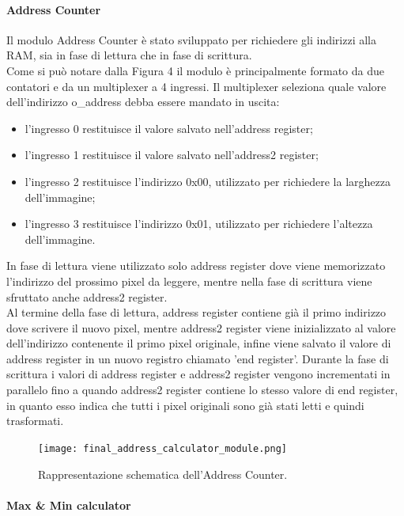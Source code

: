 \paragraph{Address Counter\\}

Il modulo Address Counter è stato sviluppato per richiedere gli indirizzi alla RAM, sia in fase di lettura che in fase di scrittura.\\
Come si può notare dalla Figura 4 il modulo è principalmente formato da due contatori e da un multiplexer a 4 ingressi. Il multiplexer seleziona quale valore dell'indirizzo o\_address debba essere mandato in uscita:
\begin{itemize}
    \item l'ingresso 0 restituisce il valore salvato nell'address register;
    \item l'ingresso 1 restituisce il valore salvato nell'address2 register;
    \item l'ingresso 2 restituisce l'indirizzo 0x00, utilizzato per richiedere la larghezza dell'immagine;
    \item l'ingresso 3 restituisce l'indirizzo 0x01, utilizzato per richiedere l'altezza dell'immagine.
\end{itemize}
In fase di lettura viene utilizzato solo address register dove viene memorizzato l'indirizzo del prossimo pixel da leggere, mentre nella fase di scrittura viene sfruttato anche address2 register.\\
Al termine della fase di lettura, address register contiene già il primo indirizzo dove scrivere il nuovo pixel, mentre address2 register viene inizializzato al valore dell'indirizzo contenente il primo pixel originale, infine viene salvato il valore di address register in un nuovo registro chiamato 'end register'.
Durante la fase di scrittura i valori di address register e address2 register vengono incrementati in parallelo fino a quando address2 register contiene lo stesso valore di end register, in quanto esso indica che tutti i pixel originali sono già stati letti e quindi trasformati.

\begin{figure}[h!]
\centering
\texttt{[image: final\_address\_calculator\_module.png]}%
\caption{Rappresentazione schematica dell'Address Counter.}
\end{figure}


\paragraph{Max \& Min calculator\\}

